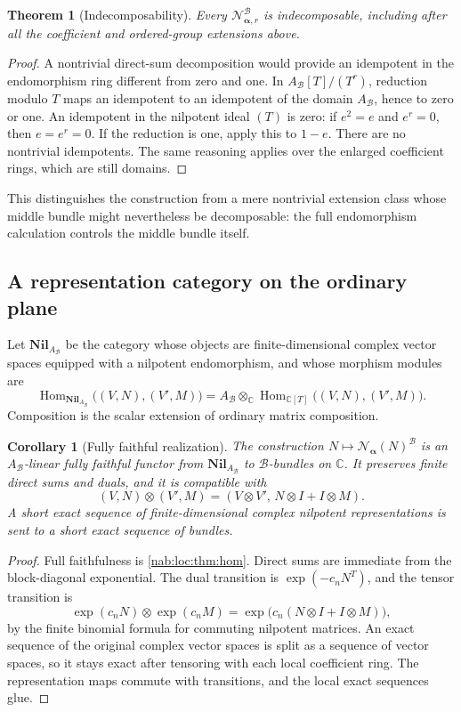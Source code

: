 \documentclass[11pt,letterpaper]{article}
\newtheorem{theorem}{Theorem}[section]
\newtheorem{corollary}[corollary]{Corollary}
\theoremstyle{definition}
\theoremstyle{remark}
\newcommand{\C}{\mathbb C}
\newcommand{\BB}{\mathscr B}
\newcommand{\Aglob}{A_{\BB}}
\newcommand{\Hom}{\operatorname{Hom}}
\newcommand{\Nil}{\mathbf{Nil}}
\newcommand{\profile}{\boldsymbol\alpha}
\newcommand{\NN}[1]{\mathcal N_{\profile,#1}}
\numberwithin{equation}{section}
\begin{document}
\begin{theorem}[Indecomposability]\label{nab:loc:thm:indecomposable}
Every $\NN r^{\BB}$ is indecomposable, including after all the coefficient and
ordered-group extensions above.
\end{theorem}

\begin{proof}
A nontrivial direct-sum decomposition would provide an idempotent in the
endomorphism ring different from zero and one. In $\Aglob[T]/(T^r)$, reduction
modulo $T$ maps an idempotent to an idempotent of the domain $\Aglob$, hence to
zero or one. An idempotent in the nilpotent ideal $(T)$ is zero: if $e^2=e$ and
$e^r=0$, then $e=e^r=0$. If the reduction is one, apply this to $1-e$. There
are no nontrivial idempotents. The same reasoning applies over the enlarged
coefficient rings, which are still domains.
\end{proof}

This distinguishes the construction from a mere nontrivial extension class
whose middle bundle might nevertheless be decomposable: the full endomorphism
calculation controls the middle bundle itself.

\subsection{A representation category on the ordinary plane}
\label{nab:loc:sub:category}

Let $\Nil_{\Aglob}$ be the category whose objects are finite-dimensional
complex vector spaces equipped with a nilpotent endomorphism, and whose
morphism modules are
\[
 \Hom_{\Nil_{\Aglob}}\bigl((V,N),(V',M)\bigr)
 =\Aglob\otimes_\C\Hom_{\C[T]}\bigl((V,N),(V',M)\bigr).
\]
Composition is the scalar extension of ordinary matrix composition.

\begin{corollary}[Fully faithful realization]\label{nab:loc:cor:category}
The construction $N\mapsto\mathcal N_{\profile}(N)^{\BB}$ is an
$\Aglob$-linear fully faithful functor from $\Nil_{\Aglob}$ to $\BB$-bundles on
$\C$. It preserves finite direct sums and duals, and it is compatible with
\[
 (V,N)\otimes(V',M)=(V\otimes V',\,N\otimes I+I\otimes M).
\]
A short exact sequence of finite-dimensional complex nilpotent representations
is sent to a short exact sequence of bundles.
\end{corollary}

\begin{proof}
Full faithfulness is \cref{nab:loc:thm:hom}. Direct sums are immediate from the
block-diagonal exponential. The dual transition is $\exp(-c_nN^T)$, and the
tensor transition is
\[
 \exp(c_nN)\otimes\exp(c_nM)=\exp\bigl(c_n(N\otimes I+I\otimes M)\bigr),
\]
by the finite binomial formula for commuting nilpotent matrices. An exact
sequence of the original complex vector spaces is split as a sequence of vector
spaces, so it stays exact after tensoring with each local coefficient ring. The
representation maps commute with transitions, and the local exact sequences
glue.
\end{proof}
\end{document}
